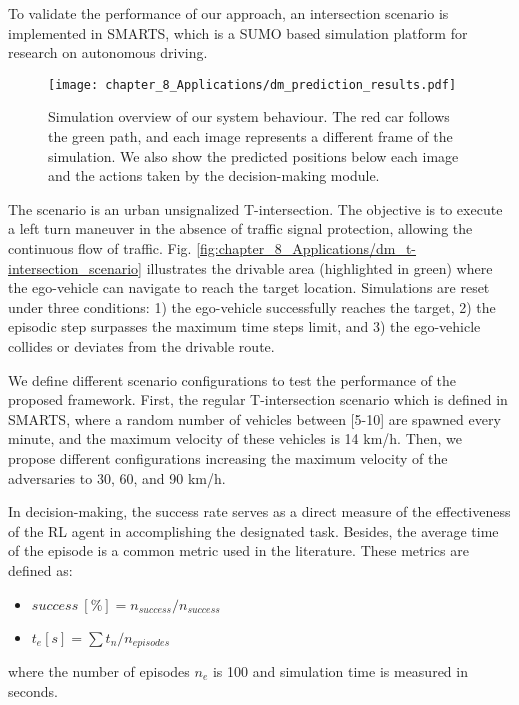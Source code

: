 To validate the performance of our approach, an intersection scenario is implemented in SMARTS, which is a SUMO \cite{Sumo} based simulation platform for research on autonomous driving.

\begin{figure}[h]
	\centering        
	\texttt{[image: chapter\_8\_Applications/dm\_prediction\_results.pdf]}
	\caption{Simulation overview of our system behaviour. The red car follows the green path, and each image represents a different frame of the simulation. We also show the predicted positions below each image and the actions taken by the decision-making module.}
	\label{fig:chapter_8_Applications/dm_prediction_results}
\end{figure}

The scenario is an urban unsignalized T-intersection. The objective is to execute a left turn maneuver in the absence of traffic signal protection, allowing the continuous flow of traffic. Fig. \ref{fig:chapter_8_Applications/dm_t-intersection_scenario} illustrates the drivable area (highlighted in green) where the ego-vehicle can navigate to reach the target location. Simulations are reset under three conditions: 1) the ego-vehicle successfully reaches the target, 2) the episodic step surpasses the maximum time steps limit, and 3) the ego-vehicle collides or deviates from the drivable route.

We define different scenario configurations to test the performance of the proposed framework. First, the regular T-intersection scenario which is defined in SMARTS, where a random number of vehicles between [5-10] are spawned every minute, and the maximum velocity of these vehicles is 14 km/h. Then, we propose different configurations increasing the maximum velocity of the adversaries to 30, 60, and 90 km/h. 

In decision-making, the success rate serves as a direct measure of the effectiveness of the RL agent in accomplishing the designated task. Besides, the average time of the episode is a common metric used in the literature. These metrics are defined as:

\begin{itemize}
	\item $success~[\%] = n_{success}/n_{success}$
	\item $t_{e} [s] = \sum{t_{n}}/n_{episodes}$
\end{itemize}

where the number of episodes $n_{e}$ is 100 and simulation time is measured in seconds. 

